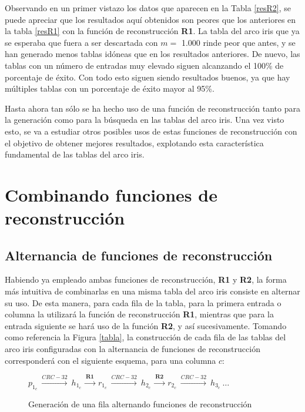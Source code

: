 \documentclass[12pt,spanish,listoffigures,listoftables,listofalgorithms]{tfgetsinf}
\begin{document}
Observando en un primer vistazo los datos que aparecen en la Tabla \ref{resR2}, se puede apreciar que los resultados aquí obtenidos son peores que los anteriores en la tabla \ref{resR1} con la función de reconstrucción \textbf{R1}. La tabla del arco iris que ya se esperaba que fuera a ser descartada con $m =$ 1.000 rinde peor que antes, y se han generado menos tablas idóneas que en los resultados anteriores. De nuevo, las tablas con un número de entradas muy elevado siguen alcanzando el 100\% de porcentaje de éxito. Con todo esto siguen siendo resultados buenos, ya que hay múltiples tablas con un porcentaje de éxito mayor al 95\%.

Hasta ahora tan sólo se ha hecho uso de una función de reconstrucción tanto para la generación como para la búsqueda en las tablas del arco iris. Una vez visto esto, se va a estudiar otros posibles usos de estas funciones de reconstrucción con el objetivo de obtener mejores resultados, explotando esta característica fundamental de las tablas del arco iris.

\section{Combinando funciones de reconstrucción}

\subsection{Alternancia de funciones de reconstrucción}

Habiendo ya empleado ambas funciones de reconstrucción, \textbf{R1} y \textbf{R2}, la forma más intuitiva de combinarlas en una misma tabla del arco iris consiste en alternar su uso. De esta manera, para cada fila de la tabla, para la primera entrada o columna la utilizará la función de reconstrucción \textbf{R1}, mientras que para la entrada siguiente se hará uso de la función \textbf{R2}, y así sucesivamente. Tomando como referencia la Figura \ref{tabla}, la construcción de cada fila de las tablas del arco iris configuradas con la alternancia de funciones de reconstrucción corresponderá con el siguiente esquema, para una columna $c$:

\begin{figure}[H]

	\centering

	$p_{1_c}~ \xrightarrow{CRC-32}~ h_{1_c}~ \xrightarrow{\textbf{R1}}~ r_{1_c}~ \xrightarrow{CRC-32}~ h_{2_c}~ \xrightarrow{\textbf{R2}}~ r_{2_c}~ \xrightarrow{CRC-32}~ h_{3_c}~ \dots$ \\

	\caption{Generación de una fila alternando funciones de reconstrucción}
	\label{filaR1R2}
	 
\end{figure}
\end{document}
